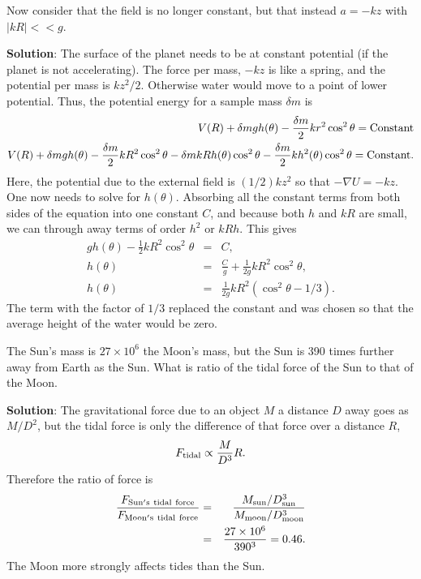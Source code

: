 \example
Now consider that the field is no longer constant, but that instead $a=-kz$ with $|kR|<<g$.

{\bf Solution}: The surface of the planet needs to be at constant potential (if the planet is not accelerating). The force per mass, $-kz$ is like a spring, and the potential per mass is $kz^2/2$. Otherwise water would move to a point of lower potential. Thus, the potential energy for a sample mass $\delta m$ is 
\begin{eqnarray*}
V(R)+\delta m gh(\theta)-\frac{\delta m}{2}kr^2\cos^2\theta={\rm Constant}\\
V(R)+\delta mgh(\theta)-\frac{\delta m}{2}kR^2\cos^2\theta-\delta m kRh(\theta)\cos^2\theta-\frac{\delta m}{2}kh^2(\theta)\cos^2\theta={\rm Constant}.
\end{eqnarray*}
Here, the potential due to the external field is $(1/2)kz^2$ so that $-\nabla U=-kz$. One now needs to solve for $h(\theta)$. Absorbing all the constant terms from both sides of the equation into one constant $C$, and because both $h$ and $kR$ are small, we can through away terms of order $h^2$ or $kRh$. This gives
\begin{eqnarray*}
gh(\theta)-\frac{1}{2}kR^2\cos^2\theta&=&C,\\
h(\theta)&=&\frac{C}{g}+\frac{1}{2g}kR^2\cos^2\theta,\\
h(\theta)&=&\frac{1}{2g}kR^2(\cos^2\theta-1/3).
\end{eqnarray*}
The term with the factor of $1/3$ replaced the constant and was chosen so that the average height of the water would be zero.

\example
The Sun's mass is $27\times 10^6$ the Moon's mass, but the Sun is 390 times further away from Earth as the Sun. What is ratio of the tidal force of the Sun to that of the Moon.

{\bf Solution}: The gravitational force due to an object $M$ a distance $D$ away goes as $M/D^2$, but the tidal force is only the difference of that force over a distance $R$,
\[
F_{\rm tidal}\propto \frac{M}{D^3}R. 
\]
Therefore the ratio of force is
\begin{eqnarray*}
\frac{F_{\rm Sun's~tidal~force}}{F_{\rm Moon's~tidal~force}}
&=&\frac{M_{\rm sun}/D_{\rm sun}^3}{M_{\rm moon}/D_{\rm moon}^3}\\
&=&\frac{27\times 10^6}{390^3}=0.46.
\end{eqnarray*}
The Moon more strongly affects tides than the Sun.

\exampleend

